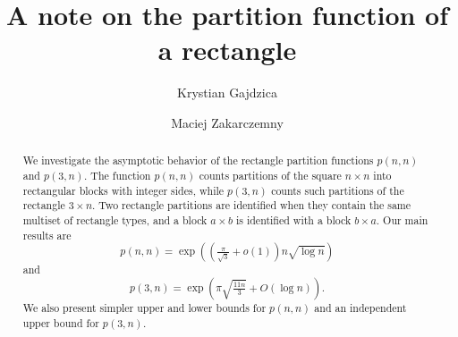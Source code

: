 \documentclass[12pt,a4paper]{amsart}
\title{A note on the partition function of a rectangle}
\author{Krystian Gajdzica}
\author{Maciej Zakarczemny}
\numberwithin{equation}{section}
\theoremstyle{plain}
\theoremstyle{definition}
\theoremstyle{remark}
\begin{document}
\setlength{\parindent}{10mm}



\begin{abstract}
We investigate the asymptotic behavior of the rectangle partition functions $p(n,n)$ and $p(3,n)$. The function $p(n,n)$ counts partitions of the square $n\times n$ into rectangular blocks with integer sides, while $p(3,n)$ counts such partitions of the rectangle $3\times n$. Two rectangle partitions are identified when they contain the same multiset of rectangle types, and a block $a\times b$ is identified with a block $b\times a$. Our main results are
$$
p(n,n)
=
\exp\left(
\left(\tfrac{\pi}{\sqrt3}+o(1)\right)n\sqrt{\log n}
\right)
$$
and
$$
p(3,n)
=
\exp\left(
\pi\sqrt{\tfrac{11n}{3}}+O(\log n)
\right).
$$
We also present simpler upper and lower bounds for $p(n,n)$ and an independent upper bound for $p(3,n)$.
\end{abstract}








\maketitle
\end{document}
